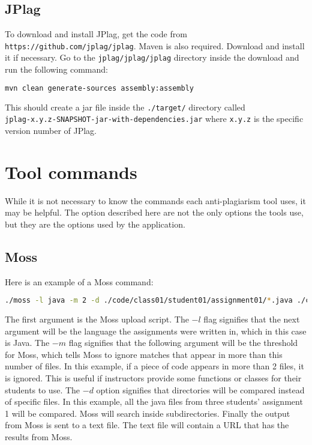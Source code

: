 \documentclass[12pt]{article}
\begin{document}
		\subsection{JPlag}
			To download and install JPlag, get the code from \\\verb|https://github.com/jplag/jplag|. Maven is also required. Download and install it if necessary. Go to the \verb|jplag/jplag/jplag| directory inside the download and run the following command:
			\begin{lstlisting}[language=bash]
	mvn clean generate-sources assembly:assembly
			\end{lstlisting}
			This should create a jar file inside the \verb|./target/| directory called \\\verb|jplag-x.y.z-SNAPSHOT-jar-with-dependencies.jar| where \verb|x.y.z| is the specific version number of JPlag.
			
	\section{Tool commands}
		While it is not necessary to know the commands each anti-plagiarism tool uses, it may be helpful. The option described here are not the only options the tools use, but they are the options used by the application.
		
		\subsection{Moss}
			Here is an example of a Moss command:
			\begin{lstlisting}[language=bash, breaklines=true]
./moss -l java -m 2 -d ./code/class01/student01/assignment01/*.java ./code/class01/student02/assignment01/*.java ./code/class01/student03/assignment01/*.java > assignment01.txt &
			\end{lstlisting}
			\noindent The first argument is the Moss upload script. The $-l$ flag signifies that the next argument will be the language the assignments were written in, which in this case is Java. The $-m$ flag signifies that the following argument will be the threshold for Moss, which tells Moss to ignore matches that appear in more than this number of files. In this example, if a piece of code appears in more than 2 files, it is ignored. This is useful if instructors provide some functions or classes for their students to use. The $-d$ option signifies that directories will be compared instead of specific files. In this example, all the java files from three students' assignment 1 will be compared. Moss will search inside subdirectories. Finally the output from Moss is sent to a text file. The text file will contain a URL that has the results from Moss.
			
\end{document}
